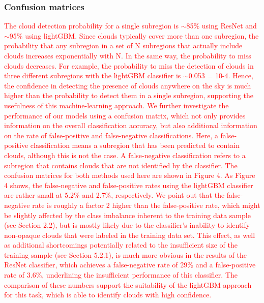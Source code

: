 \documentclass[amt, article]{copernicus}
\begin{document}
\subsubsection{Confusion matrices}

\textcolor{red}{The cloud detection probability for a single subregion is
$\sim$85\% using ResNet and $\sim$95\% using lightGBM. Since clouds
typically cover more than one subregion, the probability that
any subregion in a set of N subregions that actually include
clouds increases exponentially with N. In the same way, the
probability to miss clouds decreases. For example, the
probability to miss the detection of clouds in three different
subregions with the lightGBM classifier is $\sim$0.053 = 10-4.
Hence, the confidence in detecting the presence of clouds
anywhere on the sky is much higher than the probability to
detect them in a single subregion, supporting the usefulness of
this machine-learning approach.
We further investigate the performance of our models using
a confusion matrix, which not only provides information on the
overall classification accuracy, but also additional information
on the rate of false-positive and false-negative classifications.
Here, a false-positive classification means a subregion that has
been predicted to contain clouds, although this is not the case.
A false-negative classification refers to a subregion that
contains clouds that are not identified by the classifier. The
confusion matrices for both methods used here are shown in
Figure 4.
As Figure 4 shows, the false-negative and false-positive rates
using the lightGBM classifier are rather small at 5.2\% and
2.7\%, respectively. We point out that the false-negative rate is
roughly a factor 2 higher than the false-positive rate, which
might be slightly affected by the class imbalance inherent to the
training data sample (see Section 2.2), but is mostly likely due
to the classifier’s inability to identify non-opaque clouds that
were labeled in the training data set. This effect, as well as
additional shortcomings potentially related to the insufficient
size of the training sample (see Section 5.2.1), is much more
obvious in the results of the ResNet classifier, which achieves a
false-negative rate of 29\% and a false-positive rate of 3.6\%,
underlining the insufficient performance of this classifier. The
comparison of these numbers support the suitability of the
lightGBM approach for this task, which is able to identify
clouds with high confidence.}
\end{document}
